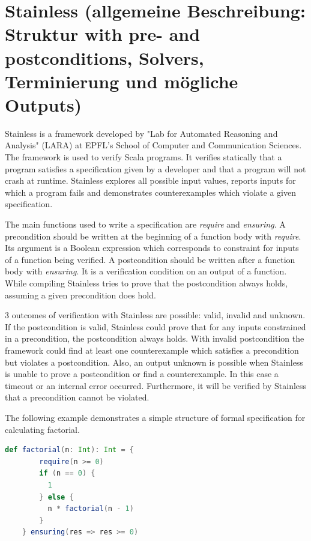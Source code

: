 \section{Stainless (allgemeine Beschreibung: Struktur with pre- and postconditions, Solvers, Terminierung und mögliche Outputs)}
\label{sec:stainless}


Stainless is a framework developed by "Lab for Automated Reasoning and Analysis" (LARA) at EPFL's School of Computer and Communication Sciences.
The framework is used to verify Scala programs.
It verifies statically that a program satisfies a specification given by a developer and that a program will not crash at runtime.
Stainless explores all possible input values, reports inputs for which a program fails and demonstrates counterexamples which violate a given specification.\cite{Stainless:introduction}

The main functions used to write a specification are \textit{require} and \textit{ensuring}. 
A precondition should be written at the beginning of a function body with \textit{require}.
Its argument is a Boolean expression which corresponds to constraint for inputs of a function being verified.
A postcondition should be written after a function body with \textit{ensuring}.
It is a verification condition on an output of a function.
While compiling Stainless tries to prove that the postcondition always holds, assuming a given precondition does hold.\cite{Stainless:introduction}

3 outcomes of verification with Stainless are possible: valid, invalid and unknown. 
If the postcondition is valid, Stainless could prove that for any inputs constrained in a precondition, the postcondition always holds.
With invalid postcondition the framework could find at least one counterexample which satisfies a precondition but violates a postcondition.
Also, an output unknown is possible when Stainless is unable to prove a postcondition or find a counterexample.
In this case a timeout or an internal error occurred.
Furthermore, it will be verified by Stainless that a precondition cannot be violated.\cite{Stainless:introduction}

The following example demonstrates a simple structure of formal specification for calculating factorial.

\begin{lstlisting}[caption=Example of verifying the function calculating factorial of an integer number, label=listing:factorial, captionpos=b, language=Scala]
    def factorial(n: Int): Int = {
        require(n >= 0)
        if (n == 0) {
          1
        } else {
          n * factorial(n - 1)
        }
    } ensuring(res => res >= 0)
\end{lstlisting}

